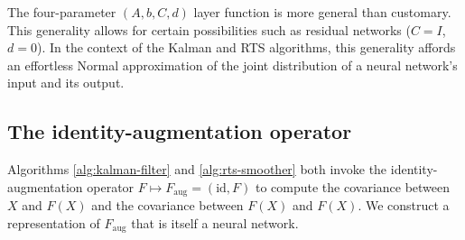 \documentclass{article} %
\begin{document}
The four-parameter \((A, b, C, d)\) layer function is more general than customary.
This generality allows for certain possibilities such as residual networks (\(C=I\), \(d=0\)).
In the context of the Kalman and RTS algorithms, this generality affords an effortless Normal approximation of the joint distribution of a neural network's input and its output.

\subsection{The identity-augmentation operator}
Algorithms \ref{alg:kalman-filter} and \ref{alg:rts-smoother}
both invoke the identity-augmentation operator \(F \mapsto F_\text{aug}=(\text{id}, F)\) to compute the covariance between \(X\) and \(F(X)\) and the covariance between \(F(X)\) and \(F(X)\).
We construct a representation of \(F_\text{aug}\) that is itself a neural network.
\end{document}
